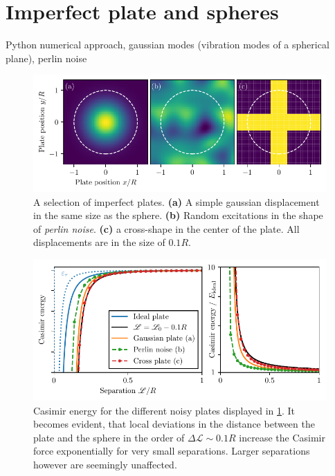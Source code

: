 \section{Imperfect plate and spheres}
\label{sec:3:imperfect-plates}

Python numerical approach, gaussian modes (vibration modes of a spherical plane), perlin noise

\begin{figure}[!htbp]
  \centering
  \includegraphics[width=\textwidth]{../figures/casimir/imperfect-plates.pdf}
  \caption{A selection of imperfect plates. \textbf{(a)} A simple gaussian displacement in the same size as the sphere. \textbf{(b)} Random excitations in the shape of \textit{perlin noise}. \textbf{(c)} a cross-shape in the center of the plate. All displacements are in the size of $0.1R$.}
  \label{fig:3:imperfect-plates}
\end{figure}

\begin{figure}[!htbp]
  \centering
  \includegraphics[width=\textwidth]{../figures/casimir/casimir-potential-imperfect-plates-relative.pdf}
  \caption{Casimir energy for the different noisy plates displayed in \cref{fig:3:imperfect-plates}. It becomes evident, that local deviations in the distance between the plate and the sphere in the order of $\Delta \mathscr{L} \sim 0.1R$ increase the Casimir force exponentially for very small separations. Larger separations however are seemingly unaffected.}
  \label{fig:3:casimir-imperfect-plates}
\end{figure}